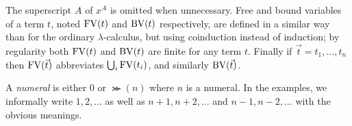 The superscript $A$ of $x^A$ is omitted when unnecessary.
Free and bound variables of a term $t$, noted ${{\rm FV}}(t)$ and ${{\rm BV}}(t)$ respectively, are defined in a similar 
way than for the ordinary $\lambda$-calculus, but using coinduction instead of induction; by regularity both 
${{\rm FV}}(t)$ and ${{\rm BV}}(t)$ are finite for any term $t$. Finally if $\vec{t} = t_1, \ldots , t_n$ then ${{\rm FV}}(\vec{t})$ abbreviates
$\bigcup_i {{\rm FV}}(t_i)$, and similarly ${{\rm BV}}(\vec{t})$.

A {\em numeral} is either $0$ or $\Succ(n)$ where $n$ is a numeral. In the examples, we informally write $1, 2, \ldots$ as well as
$n + 1, n + 2, \ldots$ and $n - 1, n - 2, \ldots$ with the obvious meanings.
